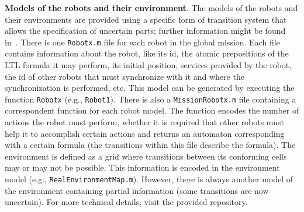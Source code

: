 \textbf{Models of the robots and their environment}. 
The models of the robots and their environments are provided using a specific form of transition system that allows the specification of uncertain parts; further information might be found in~\cite{menghi2018multi}.
There is one \texttt{Robotx.m} file for each robot in the global mission.
Each file contains information about the robot, like its id, the atomic prepositions of the LTL formula it may perform, its initial position, services provided by the robot, the id of other robots that must synchronize with it and where the synchronization is performed, etc.
This model can be generated by executing the function \texttt{Robotx} (e.g., \texttt{Robot1}).
There is also a \texttt{MissionRobotx.m} file containing a correspondent function for each robot model.
The function encodes the number of actions the robot must perform, whether it is required that other robots must help it to accomplish certain actions and returns an automaton corresponding with a certain formula (the transitions within this file describe the formula).
The environment is defined as a grid where transitions between its conforming cells may or may not be possible.
This information is encoded in the environment model (e.g., \texttt{RealEnvironmentMap.m}).
However, there is always another model of the environment containing partial information (some transitions are now uncertain).
For more technical details, visit the provided repository.


